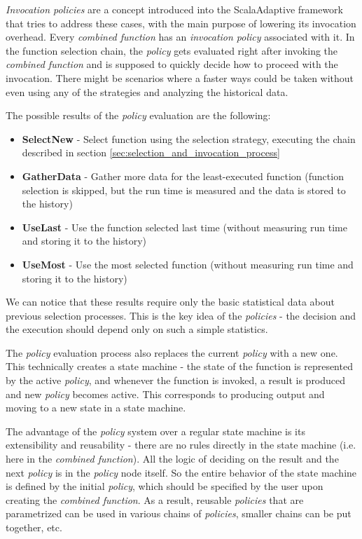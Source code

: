 \textit{Invocation policies} are a concept introduced into the ScalaAdaptive framework that tries to address these cases, with the main purpose of lowering its invocation overhead. Every \textit{combined function} has an \textit{invocation policy} associated with it. In the function selection chain, the \textit{policy} gets evaluated right after invoking the \textit{combined function} and is supposed to quickly decide how to proceed with the invocation. There might be scenarios where a faster ways could be taken without even using any of the strategies and analyzing the historical data.

The possible results of the \textit{policy} evaluation are the following:

\begin{itemize}
	\item \textbf{SelectNew} - Select function using the selection strategy, executing the chain described in section \ref{sec:selection_and_invocation_process}
	\item \textbf{GatherData} - Gather more data for the least-executed function (function selection is skipped, but the run time is measured and the data is stored to the history)
	\item \textbf{UseLast} - Use the function selected last time (without measuring run time and storing it to the history)
	\item \textbf{UseMost} - Use the most selected function (without measuring run time and storing it to the history)
\end{itemize}

We can notice that these results require only the basic statistical data about previous selection processes. This is the key idea of the \textit{policies} - the decision and the execution should depend only on such a simple statistics.

The \textit{policy} evaluation process also replaces the current \textit{policy} with a new one. This technically creates a state machine - the state of the function is represented by the active \textit{policy}, and whenever the function is invoked, a result is produced and new \textit{policy} becomes active. This corresponds to producing output and moving to a new state in a state machine.

The advantage of the \textit{policy} system over a regular state machine is its extensibility and reusability - there are no rules directly in the state machine (i.e. here in the \textit{combined function}). All the logic of deciding on the result and the next \textit{policy} is in the \textit{policy} node itself. So the entire behavior of the state machine is defined by the initial \textit{policy}, which should be specified by the user upon creating the \textit{combined function}. As a result, reusable \textit{policies} that are parametrized can be used in various chains of \textit{policies}, smaller chains can be put together, etc.

